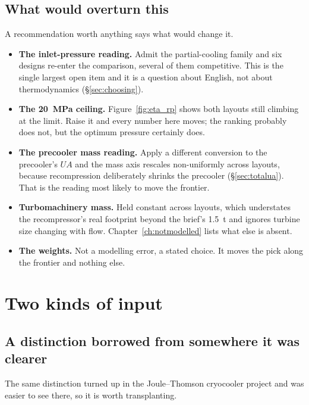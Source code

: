 \documentclass[11pt,a4paper]{report}
\begin{document}
\section{What would overturn this}

A recommendation worth anything says what would change it.

\begin{itemize}\itemsep3pt
\item \textbf{The inlet-pressure reading.} Admit the partial-cooling family
      and six designs re-enter the comparison, several of them competitive.
      This is the single largest open item and it is a question about English,
      not about thermodynamics (\S\ref{sec:choosing}).
\item \textbf{The \SI{20}{\mega\pascal} ceiling.} Figure~\ref{fig:eta_rp}
      shows both layouts still climbing at the limit. Raise it and every
      number here moves; the ranking probably does not, but the optimum
      pressure certainly does.
\item \textbf{The precooler mass reading.} Apply a different conversion to
      the precooler's $UA$ and the mass axis rescales non-uniformly across
      layouts, because recompression deliberately shrinks the precooler
      (\S\ref{sec:totalua}). That is the reading most likely to move the
      frontier.
\item \textbf{Turbomachinery mass.} Held constant across layouts, which
      understates the recompressor's real footprint beyond the brief's
      \SI{1.5}{\tonne} and ignores turbine size changing with flow.
      Chapter~\ref{ch:notmodelled} lists what else is absent.
\item \textbf{The weights.} Not a modelling error, a stated choice. It moves
      the pick along the frontier and nothing else.
\end{itemize}

\chapter{Two kinds of input}
\label{ch:inputs}

\section{A distinction borrowed from somewhere it was clearer}

The same distinction turned up in the Joule--Thomson cryocooler project and
was easier to see there, so it is worth transplanting.
\end{document}
